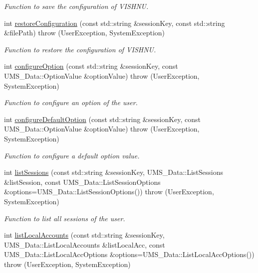 \begin{DoxyCompactItemize}
\begin{DoxyCompactList}\small\item\em Function to save the configuration of VISHNU. \item\end{DoxyCompactList}\item 
int \hyperlink{namespacevishnu_a60ecb3b47532d0df7b0d44fdf43f98f4}{restoreConfiguration} (const std::string \&sessionKey, const std::string \&filePath)  throw (UserException, SystemException)
\begin{DoxyCompactList}\small\item\em Function to restore the configuration of VISHNU. \item\end{DoxyCompactList}\item 
int \hyperlink{namespacevishnu_a5b88fcd36b780df012b2529fe3526ca1}{configureOption} (const std::string \&sessionKey, const UMS\_\-Data::OptionValue \&optionValue)  throw (UserException, SystemException)
\begin{DoxyCompactList}\small\item\em Function to configure an option of the user. \item\end{DoxyCompactList}\item 
int \hyperlink{namespacevishnu_a05878cbc7dbb3f5da87dbc32dd25ab78}{configureDefaultOption} (const std::string \&sessionKey, const UMS\_\-Data::OptionValue \&optionValue)  throw (UserException, SystemException)
\begin{DoxyCompactList}\small\item\em Function to configure a default option value. \item\end{DoxyCompactList}\item 
int \hyperlink{namespacevishnu_adaf9c8ca47f577cf1a0c9effe7bd9c52}{listSessions} (const std::string \&sessionKey, UMS\_\-Data::ListSessions \&listSession, const UMS\_\-Data::ListSessionOptions \&options=UMS\_\-Data::ListSessionOptions())  throw (UserException, SystemException)
\begin{DoxyCompactList}\small\item\em Function to list all sessions of the user. \item\end{DoxyCompactList}\item 
int \hyperlink{namespacevishnu_a2c892a93b3100eab8bd4de84f12178fa}{listLocalAccounts} (const std::string \&sessionKey, UMS\_\-Data::ListLocalAccounts \&listLocalAcc, const UMS\_\-Data::ListLocalAccOptions \&options=UMS\_\-Data::ListLocalAccOptions())  throw (UserException, SystemException)

\end{DoxyCompactItemize}
